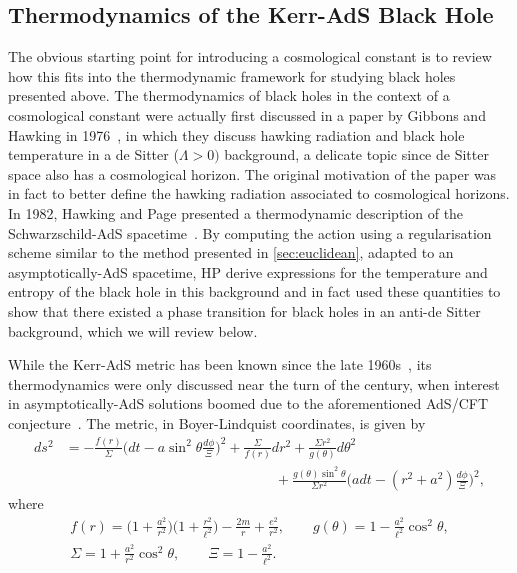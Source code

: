 \documentclass[
twoside,openright,frontopenright]{dmathesis}
\newcommand{\nn}{\nonumber}
\begin{document}
\subsection{Thermodynamics of the Kerr-AdS Black Hole}

The obvious starting point for introducing a cosmological constant is to review
how this fits into the thermodynamic framework for studying black holes
presented above. The thermodynamics of black holes in the context of a
cosmological constant were actually first discussed in a paper by Gibbons and
Hawking in 1976~\cite{Gibbons:1977mu}, in which they discuss hawking radiation
and black hole temperature in a de Sitter ($\Lambda > 0)$ background, a delicate
topic since de Sitter space also has a cosmological horizon. The original
motivation of the paper was in fact to better define the hawking radiation
associated to cosmological horizons. In 1982, Hawking and Page presented a
thermodynamic description of the Schwarzschild-AdS
spacetime~\cite{Hawking:1982dh}. By computing the action using a regularisation
scheme similar to the method presented in \cref{sec:euclidean}, adapted to an
asymptotically-AdS spacetime, HP derive expressions for the temperature and
entropy of the black hole in this background and in fact used these quantities
to show that there existed a phase transition for black holes in an anti-de
Sitter background, which we will review below.

While the Kerr-AdS metric has been known since the late
1960s~\cite{Carter:1968ks}, its thermodynamics were only discussed near the turn
of the century, when interest in asymptotically-AdS solutions boomed due to the
aforementioned AdS/CFT
conjecture~\cite{Hawking:1998kw,Caldarelli:1999xj,Silva:2002jq,Gibbons:2004ai}. The
metric, in Boyer-Lindquist coordinates, is given by
\begin{align}
  ds^2 &= -\frac{f(r)}{\Sigma}\Big(dt - a \sin^2 \theta \frac{d\phi}{\Xi}\Big)^2 +
         \frac{\Sigma}{f(r)}dr^2 + \frac{\Sigma r^2}{g(\theta)} d\theta^2 \nn\\
  &\hspace{15em}+ \frac{g(\theta)\sin^2\theta}{\Sigma r^2}\Big(adt -
    (r^2+a^2)\frac{d\phi}{\Xi}\Big)^2,
    \label{eq:kerrAdS}
\end{align}
where
\begin{gather}
f(r) = \Big(1 + \frac{a^2}{r^2}\Big) \Big(1 + \frac{r^2}{\ell^2}\Big) -
\frac{2m}{r}+\frac{e^2}{r^2}, \qquad g(\theta) = 1 -
\frac{a^2}{\ell^2}\cos^2\theta, \nn\\ 
\Sigma = 1+\frac{a^2}{r^2}\cos^2\theta,\qquad \Xi = 1-\frac{a^2}{\ell^2}.
\end{gather}
\end{document}
